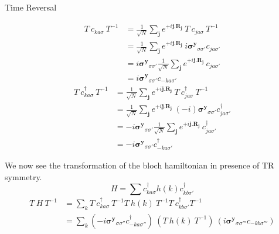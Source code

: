 \documentclass[12pt, oneside, listof=totoc,dvipsnames]{scrbook}
\begin{document}
\begin{chapter}{Time Reversal}
		\begin{multicols}{2}
			\noindent
			\begin{align*}
				T \ c_{ka\sigma}\ T^{-1}&= \frac{1}{\sqrt{N}} \sum \limits_\mathbf{j}e^{+i\mathbf{j.R_j}}\ T\ c_{ja\sigma} \ T^{-1}\\
				&= \frac{1}{\sqrt{N}} \sum \limits_\mathbf{j}e^{+i\mathbf{j.R_j}}\ i \mathbf{\sigma^y}_{\sigma\sigma'} c_{ja\sigma'}\\
				&=i \mathbf{\sigma^y}_{\sigma\sigma'}  \frac{1}{\sqrt{N}} \sum \limits_\mathbf{j}e^{+i\mathbf{j.R_j}}\  c_{ja\sigma'}\\
				&=i \mathbf{\sigma^y}_{\sigma\sigma'}  c_{-ka\sigma'}
			\end{align*}
			\begin{align*}
				T \ c^\dagger_{ka\sigma}\ T^{-1}&= \frac{1}{\sqrt{N}} \sum \limits_\mathbf{j}e^{+i\mathbf{j.R_j}}\ T\ c^\dagger_{ja\sigma} \ T^{-1}\\
				&= \frac{1}{\sqrt{N}} \sum \limits_\mathbf{j}e^{+i\mathbf{j.R_j}}\ (-i) \mathbf{\sigma^y}_{\sigma\sigma'} c^\dagger_{ja\sigma'}\\
				&=-i \mathbf{\sigma^y}_{\sigma\sigma'}  \frac{1}{\sqrt{N}} \sum \limits_\mathbf{j}e^{+i\mathbf{j.R_j}}\  c^\dagger_{ja\sigma'}\\
				&=-i \mathbf{\sigma^y}_{\sigma\sigma'}  c^\dagger_{-ka\sigma'}
			\end{align*}
		\end{multicols}
		We now see the transformation of the bloch hamiltonian in presence of TR symmetry. 
		\[ H = \sum \limits c^\dagger_{ka\sigma}h(k)c^\dagger_{kb\sigma'}\]
		\begin{align*}
			T \ H \ T^{-1}&= \sum \limits_k T\ c^\dagger_{ka\sigma}\ T^{-1}T\ h(k)\  T^{-1}T \ c^\dagger_{kb\sigma' }T^{-1}\\
			&=\sum \limits_k (-i \mathbf{\sigma^y}_{\sigma\sigma''}  c^\dagger_{-ka\sigma''}) \ (T\ h(k)\  T^{-1})\ ( i \mathbf{\sigma^y}_{\sigma\sigma'''}  c_{-kb\sigma'''})
		\end{align*}
	\end{chapter}
	
	
	
	
	
	
	
	
	
	
	
	
	
	
	
	
	
	
	
	
	
\end{document}
